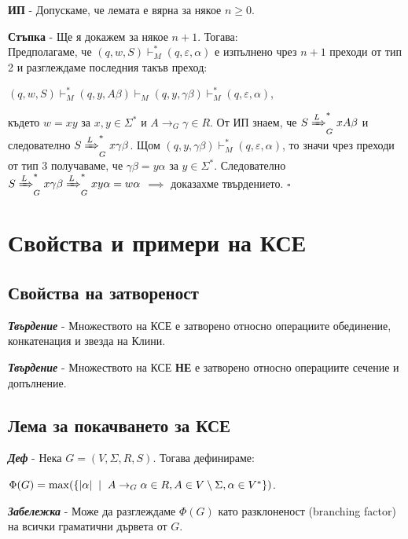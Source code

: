 \documentclass[fleqn,12pt]{article}
\DeclareMathOperator{\mmax}{max}
\begin{document}
\begin{flushleft}
\textbf{ИП} - Допускаме, че лемата е вярна за някое $n \geq 0$.

\textbf{Стъпка} - Ще я докажем за някое $n + 1$. Тогава: \\

Предполагаме, че $(q, w, S) \vdash_M^* (q, \varepsilon, \alpha)$ е изпълнено чрез $n+1$ преходи от тип 2 и разглеждаме последния такъв преход:

$(q, w, S) \vdash_M^* (q, y, A\beta) \vdash_M (q, y, \gamma\beta) \vdash_M^* (q, \varepsilon, \alpha)$,

където $w = xy$ за $x, y \in \Sigma^*$ и $A \to_G \gamma \in R$. От ИП знаем, че $S \xRightarrow[]{L}_G^* xA\beta$ и следователно $S \xRightarrow[]{L}_G^* x\gamma\beta$.
Щом $(q, y, \gamma\beta) \vdash_M^* (q, \varepsilon, \alpha)$, то значи чрез преходи от тип 3 получаваме, че $\gamma\beta = y\alpha$ за $y \in \Sigma^*$.
Следователно $S \xRightarrow[]{L}_G^* x\gamma\beta \xRightarrow[]{L}_G^* xy\alpha = w\alpha$
$\implies$ доказахме твърдението.
$\square$

\section{Свойства и примери на КСЕ}

\subsection{Свойства на затвореност}

\textit{\textbf{Твърдение}} - Множеството на КСЕ е затворено относно операциите обединение, конкатенация и звезда на Клини.

\textit{\textbf{Твърдение}} - Множеството на КСЕ \textbf{НЕ} е затворено относно операциите сечение и допълнение.

\subsection{Лема за покачването за КСЕ}

\textit{\textbf{Деф}} - Нека $G = (V, \Sigma, R, S)$. Тогава дефинираме: 

$\Phi(G) = \mmax(\{|\alpha| \hspace{2mm} | \hspace{2mm} A \to_G \alpha \in R, A \in V \setminus \Sigma, \alpha \in V^*\})$.

\textit{\textbf{Забележка}} - Може да разглеждаме $\Phi(G)$ като разклоненост (branching factor) на всички граматични дървета от $G$.


\end{flushleft}
\end{document}
